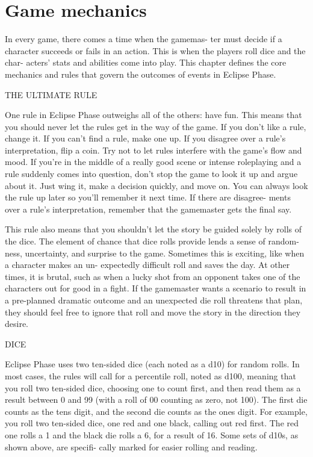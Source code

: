 \chapter{Game mechanics}
\label{chap:game-mechanics}

In every game, there comes a time when the gamemas-
ter must decide if a character succeeds or fails in an
action. This is when the players roll dice and the char-
acters' stats and abilities come into play. This chapter
defines the core mechanics and rules that govern the
outcomes of events in Eclipse Phase.

THE ULTIMATE RULE

One rule in Eclipse Phase outweighs all of the others:
have fun. This means that you should never let the
rules get in the way of the game. If you don't like a
rule, change it. If you can't find a rule, make one up.
If you disagree over a rule's interpretation, flip a coin.
Try not to let rules interfere with the game's flow and
mood. If you're in the middle of a really good scene
or intense roleplaying and a rule suddenly comes into
question, don't stop the game to look it up and argue
about it. Just wing it, make a decision quickly, and
move on. You can always look the rule up later so
you'll remember it next time. If there are disagree-
ments over a rule's interpretation, remember that the
gamemaster gets the final say.

This rule also means that you shouldn't let the story
be guided solely by rolls of the dice. The element of
chance that dice rolls provide lends a sense of random-
ness, uncertainty, and surprise to the game. Sometimes
this is exciting, like when a character makes an un-
expectedly difficult roll and saves the day. At other
times, it is brutal, such as when a lucky shot from an
opponent takes one of the characters out for good in a
fight. If the gamemaster wants a scenario to result in a
pre-planned dramatic outcome and an unexpected die
roll threatens that plan, they should feel free to ignore
that roll and move the story in the direction they desire.

DICE

Eclipse Phase uses two ten-sided dice (each noted as
a d10) for random rolls. In most cases, the rules will
call for a percentile roll, noted as d100, meaning that
you roll two ten-sided dice, choosing one to count first,
and then read them as a result between 0 and 99 (with
a roll of 00 counting as zero, not 100). The first die
counts as the tens digit, and the second die counts as
the ones digit. For example, you roll two ten-sided
dice, one red and one black, calling out red first. The
red one rolls a 1 and the black die rolls a 6, for a result
of 16. Some sets of d10s, as shown above, are specifi-
cally marked for easier rolling and reading.

